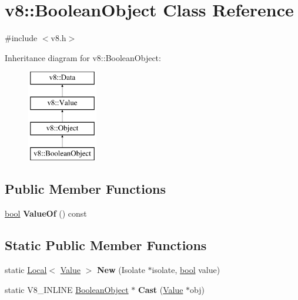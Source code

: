 \hypertarget{classv8_1_1BooleanObject}{}\section{v8\+:\+:Boolean\+Object Class Reference}
\label{classv8_1_1BooleanObject}


{\ttfamily \#include $<$v8.\+h$>$}

Inheritance diagram for v8\+:\+:Boolean\+Object\+:\begin{figure}[H]
\begin{center}
\leavevmode
\includegraphics[height=4.000000cm]{classv8_1_1BooleanObject}
\end{center}
\end{figure}
\subsection*{Public Member Functions}
\begin{DoxyCompactItemize}
\item 
\mbox{\label{classv8_1_1BooleanObject_a4f2f60a73ce9a730dd43046672b7b58b}} 
\mbox{\hyperlink{classbool}{bool}} {\bfseries Value\+Of} () const
\end{DoxyCompactItemize}
\subsection*{Static Public Member Functions}
\begin{DoxyCompactItemize}
\item 
\mbox{\label{classv8_1_1BooleanObject_a2cdd408e1318a28cdffe48185f225ec6}} 
static \mbox{\hyperlink{classv8_1_1Local}{Local}}$<$ \mbox{\hyperlink{classv8_1_1Value}{Value}} $>$ {\bfseries New} (Isolate $\ast$isolate, \mbox{\hyperlink{classbool}{bool}} value)
\item 
\mbox{\label{classv8_1_1BooleanObject_a30b2a406f4dd98660c9b8f6030b3f914}} 
static V8\+\_\+\+I\+N\+L\+I\+NE \mbox{\hyperlink{classv8_1_1BooleanObject}{Boolean\+Object}} $\ast$ {\bfseries Cast} (\mbox{\hyperlink{classv8_1_1Value}{Value}} $\ast$obj)
\end{DoxyCompactItemize}


